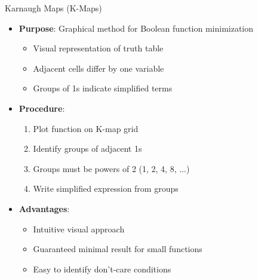 \documentclass[aspectratio=169,11pt]{beamer}
\newcommand{\concept}[1]{\textbf{\color{accentcolor}#1}}
\begin{document}
\begin{frame}{Karnaugh Maps (K-Maps)}
\begin{itemize}
\item \concept{Purpose}: Graphical method for Boolean function minimization
\begin{itemize}
\item Visual representation of truth table
\item Adjacent cells differ by one variable
\item Groups of 1s indicate simplified terms
\end{itemize}
\vspace{0.5cm}
\item \concept{Procedure}:
\begin{enumerate}
\item Plot function on K-map grid
\item Identify groups of adjacent 1s
\item Groups must be powers of 2 (1, 2, 4, 8, ...)
\item Write simplified expression from groups
\end{enumerate}
\vspace{0.3cm}
\item \concept{Advantages}:
\begin{itemize}
\item Intuitive visual approach
\item Guaranteed minimal result for small functions
\item Easy to identify don't-care conditions
\end{itemize}
\end{itemize}
\end{frame}
\end{document}
